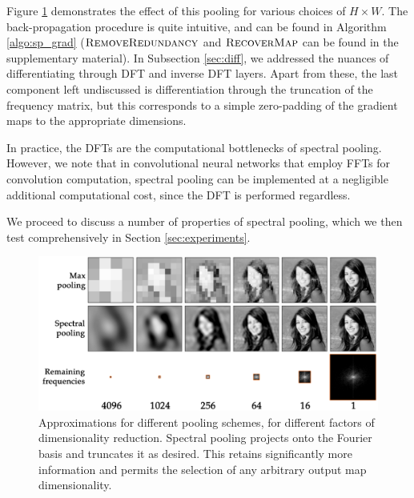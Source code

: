 \documentclass{article} %
\begin{document}
Figure \ref{fig:pooling} demonstrates the effect of this pooling for various choices of ${H\times W}$. The back-propagation procedure is quite intuitive, and can be found in Algorithm \ref{algo:sp_grad} ($\textsc{RemoveRedundancy}$ and $\textsc{RecoverMap}$ can be found in the supplementary material). In Subsection \ref{sec:diff}, we addressed the nuances of differentiating through DFT and inverse DFT layers. Apart from these, the last component left undiscussed is differentiation through the truncation of the frequency matrix, but this corresponds to a simple zero-padding of the gradient maps to the appropriate dimensions.

In practice, the DFTs are the computational bottlenecks of spectral pooling. However, we note that in convolutional neural networks that employ FFTs for convolution computation, spectral pooling can be implemented at a negligible additional computational cost, since the DFT is performed regardless.

We proceed to discuss a number of properties of spectral pooling, which we then test comprehensively in Section \ref{sec:experiments}.

\begin{figure}[t]
\centering%
  \includegraphics[width=1.0\linewidth,trim=0cm 0cm 0cm 0cm,clip]{./figures/pooling.pdf}%
\caption{Approximations for different pooling schemes, for different factors of dimensionality reduction. Spectral pooling projects onto the Fourier basis and truncates it as desired. This retains significantly more information and permits the selection of any arbitrary output map dimensionality.}

\label{fig:pooling}
\end{figure}


\end{document}
